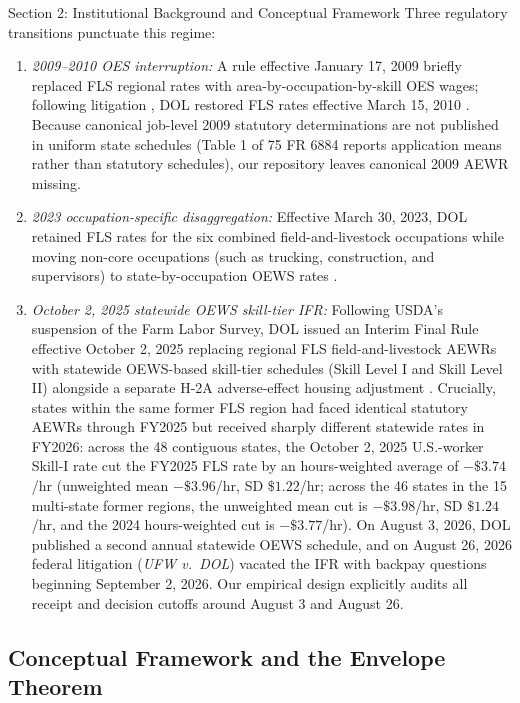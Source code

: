 \begin{llmdraft}{Section 2: Institutional Background and Conceptual Framework}
Three regulatory transitions punctuate this regime:
\begin{enumerate}
  \item \emph{2009--2010 OES interruption:} A rule effective January 17, 2009
    briefly replaced FLS regional rates with area-by-occupation-by-skill OES
    wages; following litigation \citep{ncga_v_solis_2009}, DOL restored FLS
    rates effective March 15, 2010 \citep{dol_2010_fr}. Because canonical
    job-level 2009 statutory determinations are not published in uniform state
    schedules (Table 1 of 75 FR 6884 reports application means rather than
    statutory schedules), our repository leaves canonical 2009 AEWR missing.
  \item \emph{2023 occupation-specific disaggregation:} Effective March 30,
    2023, DOL retained FLS rates for the six combined field-and-livestock
    occupations while moving non-core occupations (such as trucking,
    construction, and supervisors) to state-by-occupation OEWS rates
    \citep{dol_2023_fr}.
  \item \emph{October 2, 2025 statewide OEWS skill-tier IFR:} Following USDA's
    suspension of the Farm Labor Survey, DOL issued an Interim Final Rule
    effective October 2, 2025 replacing regional FLS field-and-livestock AEWRs
    with statewide OEWS-based skill-tier schedules (Skill Level I and Skill
    Level II) alongside a separate H-2A adverse-effect housing adjustment
    \citep{dol_2025_ifr}. Crucially, states within the same former FLS region
    had faced identical statutory AEWRs through FY2025 but received sharply
    different statewide rates in FY2026: across the 48 contiguous states, the
    October 2, 2025 U.S.-worker Skill-I rate cut the FY2025 FLS rate by an
    hours-weighted average of $-\$3.74$/hr (unweighted mean $-\$3.96$/hr, SD
    $\$1.22$/hr; across the 46 states in the 15 multi-state former regions, the
    unweighted mean cut is $-\$3.98$/hr, SD $\$1.24$/hr, and the 2024
    hours-weighted cut is $-\$3.77$/hr). On August 3, 2026,
    DOL published a second annual statewide OEWS schedule, and on August 26,
    2026 federal litigation (\emph{UFW v.\ DOL}) vacated the IFR with backpay
    questions beginning September 2, 2026. Our empirical design explicitly
    audits all receipt and decision cutoffs around August 3 and August 26.
\end{enumerate}

\subsection{Conceptual Framework and the Envelope Theorem}


\end{llmdraft}
